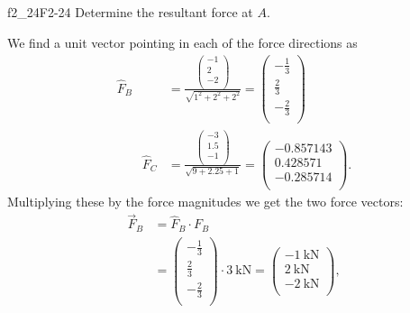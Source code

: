 
\begin{problemwithimage}{f2_24}{F2-24}
  Determine the resultant force at $A$.
\end{problemwithimage}

\begin{derivation}
  We find a unit vector pointing in each of the force directions as
  \begin{align*}
    \hat{F}_B &= \frac{\begin{pmatrix}
      - 1\\
    2\\
    -2\\
\end{pmatrix}}{\sqrt{1^2 + 2^2 + 2^2}}  = \left(
\begin{array}{c}
 -\frac{1}{3} \\
 \frac{2}{3} \\
 -\frac{2}{3} \\
\end{array}
        \right) \\ \qquad \hat{F}_C &= \frac{\begin{pmatrix}
  -3\\
1.5\\
-1\\
\end{pmatrix}}{\sqrt{9 + 2.25 + 1}} = \left(
\begin{array}{c}
 -0.857143 \\
 0.428571 \\
 -0.285714 \\
\end{array}
\right)
.\end{align*}
Multiplying these by the force magnitudes we get the two force vectors:
\begin{align*}
  \Vec{F}_B &= \hat{F}_B \cdot F_B \\
  &= \begin{pmatrix}
    - \frac{1}{3}\\
  \frac{2}{3}\\
  - \frac{2}{3}\\
  \end{pmatrix} \cdot \qty{3}{\kN}  = \begin{pmatrix}
    - \qty{1}{\kN} \\
  \qty{2}{\kN} \\
  -\qty{2}{\kN} \\
  \end{pmatrix},

\end{align*}
\end{derivation}
